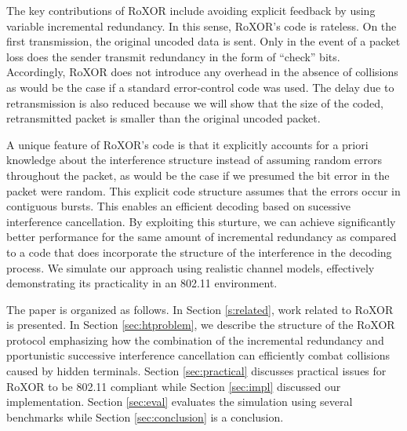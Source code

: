 The key contributions of RoXOR include avoiding explicit feedback by using variable incremental redundancy. In this sense, RoXOR's code is rateless. On the first transmission, the original uncoded data is sent. Only in the event of a packet loss does the sender transmit redundancy in the form of ``check'' bits. Accordingly, RoXOR does not introduce any overhead in the absence of collisions as would be the case if a standard error-control code was used. 
The delay due to retransmission is also reduced because  we will show that the size of the coded, retransmitted packet is smaller than the original uncoded packet.

A unique feature of RoXOR's code is that it explicitly accounts for a priori knowledge about the interference structure instead of assuming random errors throughout the packet, as would be the case if we presumed the bit error in the packet were random. This explicit code structure assumes that the errors occur in contiguous bursts. This enables an efficient decoding based on sucessive interference cancellation. By exploiting this sturture, we can achieve significantly better performance for the same amount of incremental redundancy as compared to a code that does incorporate the structure of the interference in the decoding process.  We simulate our approach using realistic channel models, effectively demonstrating its practicality in an 802.11 environment.

The paper is organized as follows. In Section \ref{s:related}, work related to RoXOR is presented. In Section \ref{sec:htproblem}, we describe the structure of the RoXOR protocol emphasizing how the combination of the incremental 
redundancy and pportunistic successive interference cancellation can efficiently combat collisions caused by hidden terminals. Section \ref{sec:practical} discusses practical issues for RoXOR to be 802.11 compliant while Section 
\ref{sec:impl} discussed our implementation. Section \ref{sec:eval} evaluates the simulation using several benchmarks while Section \ref{sec:conclusion} is a conclusion.